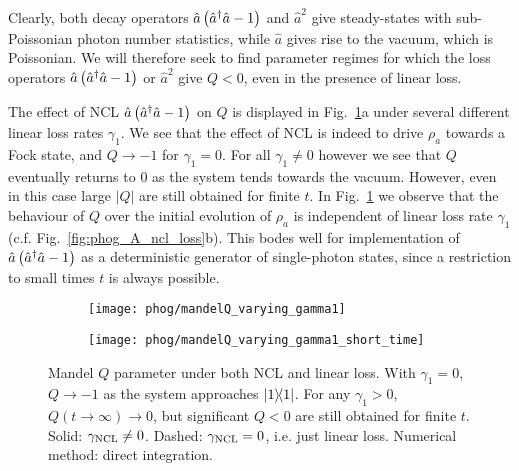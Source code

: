 Clearly, both decay operators $\hat{a}\left(\hat{a}^\dagger \hat{a} - 1\right)$ and $\hat{a}^2$ give steady-states with sub-Poissonian photon number statistics, while $\hat{a}$ gives rise to the vacuum, which is Poissonian. We will therefore seek to find parameter regimes for which the loss operators $\hat{a}\left(\hat{a}^\dagger \hat{a} - 1\right)$ or $\hat{a}^2$ give $Q<0$, even in the presence of linear loss.


The effect of NCL $\hat{a}\left(\hat{a}^\dagger \hat{a} - 1\right)$ on $Q$ is displayed in Fig.~\ref{fig:phog_ncl_Q}a under several different linear loss rates $\gamma_1$. We see that the effect of NCL is indeed to drive $\rho_a$ towards a Fock state, and $Q \rightarrow -1$ for $\gamma_1 = 0$. For all $\gamma_1 \ne 0$ however we see that $Q$ eventually returns to $0$ as the system tends towards the vacuum. However, even in this case large $\left|Q\right|$ are still obtained for finite $t$. In Fig.~\ref{fig:phog_ncl_Q} we observe that the behaviour of $Q$ over the initial evolution of $\rho_a$ is independent of linear loss rate $\gamma_1$ (c.f. Fig.~\ref{fig:phog_A_ncl_loss}b). This bodes well for implementation of $\hat{a}\left(\hat{a}^\dagger \hat{a} - 1\right)$ as a deterministic generator of single-photon states, since a restriction to small times $t$ is always possible.

\begin{figure}[htp]
\centering
	\begin{subfigure}{0.49\linewidth}
	\caption{}
	\texttt{[image: phog/mandelQ\_varying\_gamma1]}
	\end{subfigure}
	\begin{subfigure}{0.49\linewidth}
	\caption{}
	\texttt{[image: phog/mandelQ\_varying\_gamma1\_short\_time]}
	\end{subfigure}
\caption{\label{fig:phog_ncl_Q} Mandel $Q$ parameter under both NCL and linear loss. With $\gamma_1=0$, $Q \rightarrow -1$ as the system approaches $\dyad{1}$. For any $\gamma_1 > 0$, $Q\left(t\rightarrow\infty\right) \rightarrow 0$, but significant $Q < 0$ are still obtained for finite $t$. Solid: $\gamma_{\text{NCL}} \ne 0$. Dashed: $\gamma_{\text{NCL}} = 0$, i.e. just linear loss. Numerical method: direct integration.}
\end{figure}

